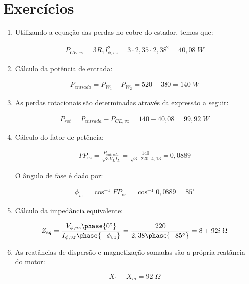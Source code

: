 \documentclass[a4paper,12pt,oneside]{article}
\begin{document}
\newpage

\section{Exercícios}
\renewcommand{\labelenumi}{$\textbf{\textcolor{Azul}{\arabic{enumi}.}}$}
\renewcommand{\labelenumii}{$\textbf{\textcolor{Azul}{(\alph{enumii})}}$}
\renewcommand{\labelitemi}{\textbf{+}}
\begin{enumerate}
\item Utilizando a equação das perdas no cobre do estador, temos que:

\begin{align}
\nonumber P_{CE,vz} = 3R_1 I_{\phi , vz}^2 = 3\cdot2,35\cdot2,38^2 = 40,08 \; W
\end{align}

\item Cálculo da potência de entrada:

\begin{align}
\nonumber P_{entrada} = P_{W_1} - P_{W_2} = 520 - 380 = 140 \; W
\end{align}

\item As perdas rotacionais são determinadas através da expressão a seguir:

\begin{align}
\nonumber P_{rot} = P_{entrada} - P_{CE,vz} = 140 - 40,08 = 99,92 \; W
\end{align}

\item Cálculo do fator de potência:

\begin{align}
\nonumber FP_{vz} = \frac{P_{entrada}}{\sqrt{3}V_L I_L} = \frac{140}{\sqrt{3}\cdot 220 \cdot 4,13} = 0,0889
\end{align}

O ângulo de fase é dado por:

\begin{align}
\nonumber \phi_{vz} = \cos ^{-1} FP_{vz} = \cos ^{-1} 0,0889 = 85^{\circ}
\end{align}

\item Cálculo da impedância equivalente:

\begin{equation}
\nonumber Z_{eq} = \frac{V_{\phi ,vz} \phase{0^\circ}}{I_{\phi ,vz} \phase{-\phi_{vz}}} = \frac{220}{2,38 \phase{-85^\circ}} = 8 + 92i \; \Omega
\end{equation}

\item As reatâncias de dispersão e magnetização somadas são a própria reatância do motor:

\begin{equation}
\nonumber X_1 + X_m = 92 \; \Omega
\end{equation}



\end{enumerate}
\end{document}
